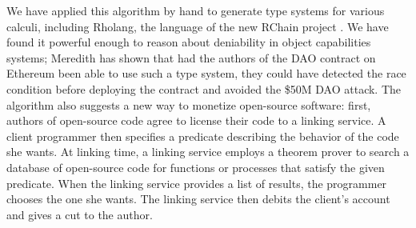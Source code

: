 \documentclass[submission,copyright,creativecommons]{eptcs}
\begin{document}
We have applied this algorithm by hand to generate type systems for various calculi, including Rholang, the language of the new RChain project \cite{Rholang}.  We have found it powerful enough to reason about deniability in object capabilities systems; Meredith \cite{GregDAO} has shown that had the authors of the DAO contract on Ethereum been able to use such a type system, they could have detected the race condition before deploying the contract and avoided the \$50M DAO attack.  The algorithm also suggests a new way to monetize open-source software: first, authors of open-source code agree to license their code to a linking service.  A client programmer then specifies a predicate describing the behavior of the code she wants.  At linking time, a linking service employs a theorem prover to search a database of open-source code for functions or processes that satisfy the given predicate.  When the linking service provides a list of results, the programmer chooses the one she wants.  The linking service then debits the client's account and gives a cut to the author.
\end{document}
